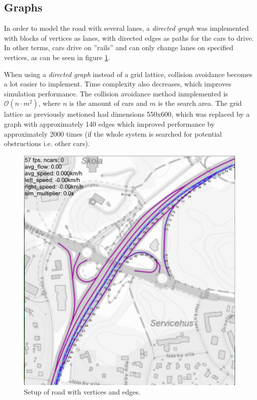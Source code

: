 \documentclass{article}
\begin{document}
  \subsection{Graphs}
  \begin{multicols}{2}
    In order to model the road with several lanes, a \textit{directed graph} was
    implemented with blocks of vertices as lanes, with directed edges as paths
    for the cars to drive. In other terms, cars drive on ''rails'' and can
    only change lanes on specified vertices, as can be seen in figure \ref{pic:graph}. \cite{noauthor_gerichteter_2018}

    When using a \textit{directed graph} instead of a grid lattice, collision avoidance becomes a lot easier
    to implement. Time complexity also decreases, which improves simulation performance.
    The collision avoidance method inmplemented is $\mathcal{O}(n\cdot m^{2})$, where $n$ is the amount of cars and $m$ is the
    search area. The grid lattice as previously metioned had dimensions 550x600, which was replaced
    by a graph with approximately 140 edges which improved performance by approximately
    2000 times (if the whole system is searched for potential obstructions i.e. other cars).

    \vfill\null
    \columnbreak

    \begin{figure}[H]
      \begin{center}
        \includegraphics[width=0.8\linewidth]{"pic2"}
        \caption{Setup of road with vertices and edges.}
        \label{pic:graph}
      \end{center}
    \end{figure}
  \end{multicols}
\end{document}
